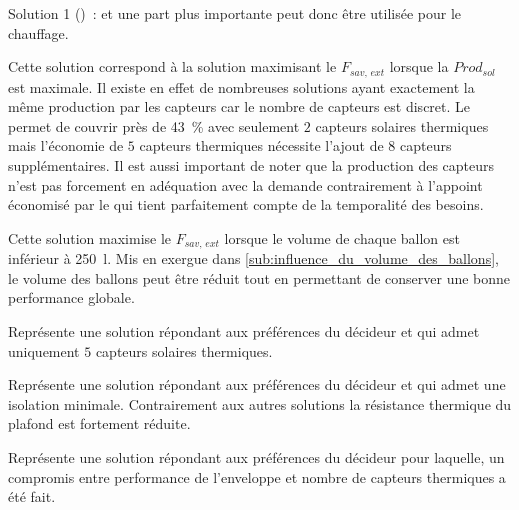 \begin{blockdescription}{Solution 1 ()~:}
                                 et une part plus importante peut donc être utilisée pour le chauffage.
  \item[Solution 4 (\abr{S4})~:] Cette solution correspond à la solution maximisant le $F_{sav,\,ext}$ lorsque
                                 la $Prod_{sol}$ est maximale. Il existe en effet de nombreuses solutions ayant exactement
                                 la même production par les capteurs  car le nombre de capteurs est discret.
                                 Le  permet de couvrir près de \SI{43}{\percent} avec seulement $2$ capteurs
                                 solaires thermiques mais l’économie de $5$ capteurs thermiques nécessite l’ajout
                                 de $8$ capteurs  supplémentaires. Il est aussi important de noter que
                                 la production des capteurs n’est pas forcement en adéquation avec la demande
                                 contrairement à l’appoint économisé par le  qui tient parfaitement compte
                                 de la temporalité des besoins.
  \item[Solution 5 (\abr{S5})~:] Cette solution maximise le $F_{sav,\,ext}$ lorsque le volume de chaque
                                 ballon est inférieur à \SI{250}{\litre}. Mis en exergue dans
                                 \ref{sub:influence_du_volume_des_ballons},
                                 le volume des ballons peut être réduit tout en permettant de
                                 conserver une bonne performance globale.
  \item[Solution 6 (\abr{S6})~:] Représente une solution répondant aux préférences du décideur
                                 et qui admet uniquement $5$ capteurs solaires thermiques.
  \item[Solution 7 (\abr{S7})~:] Représente une solution répondant aux préférences du décideur
                                 et qui admet une isolation minimale. Contrairement aux autres
                                 solutions la résistance thermique du plafond est fortement réduite.
  \item[Solution 8 (\abr{S8})~:] Représente une solution répondant aux préférences du décideur
                                 pour laquelle, un compromis entre performance de l’enveloppe
                                 et nombre de capteurs thermiques a été fait.
\end{blockdescription}

